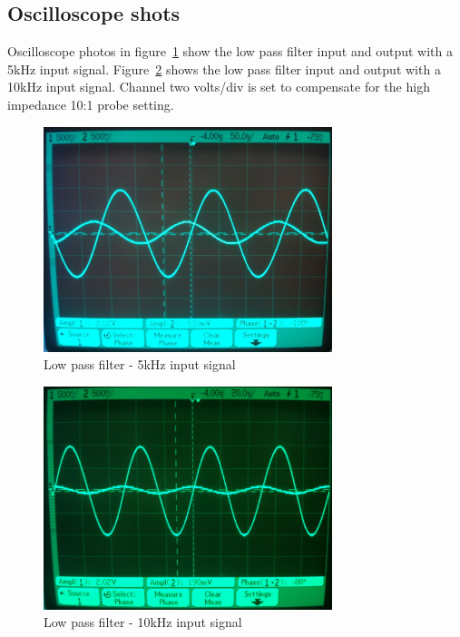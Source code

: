 \documentclass[11pt,a4paper]{article}
\begin{document}
\subsection{Oscilloscope shots}\label{lpf-oscilloscope-shots}
Oscilloscope photos in figure~\ref{fig:lpf-5k} show the low pass filter input
and output with a 5kHz input signal.  Figure~\ref{fig:lpf-10k} shows the low
pass filter input and output with a 10kHz input signal. Channel two volts/div
is set to compensate for the high impedance 10:1 probe setting. 

\begin{figure}[htbp]
    \centering
    \includegraphics[width=0.75\textwidth]{img/lpf-5k.jpg}
    \caption{Low pass filter - 5kHz input signal}
    \label{fig:lpf-5k}
\end{figure}

\begin{figure}[htbp]
    \centering
    \includegraphics[width=0.75\textwidth]{img/lpf-10k.jpg}
    \caption{Low pass filter - 10kHz input signal}
    \label{fig:lpf-10k}
\end{figure}
\end{document}
